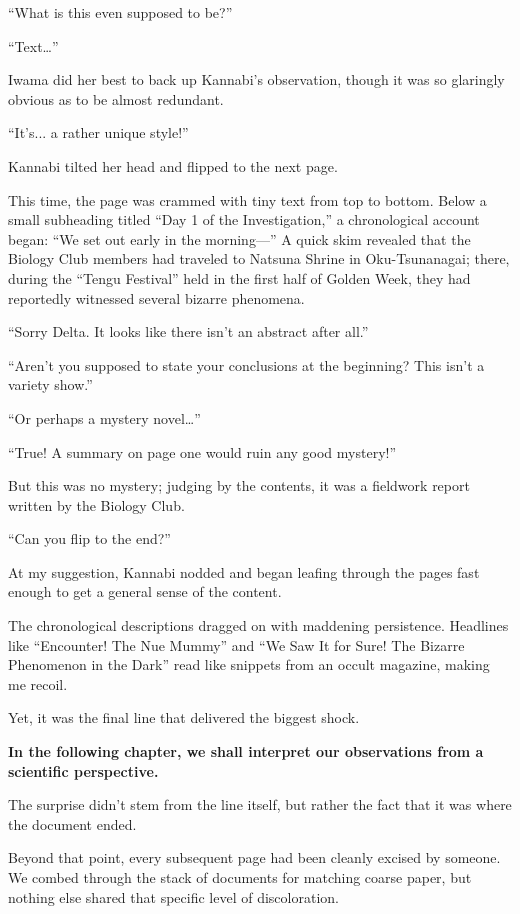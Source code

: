\documentclass[
    a4paper,
    12pt,
    twoside,
    openany,
    UTF8,
    fontset=windows
]{ctexbook}
\begin{document}
``What is this even supposed to be?''

``Text\dots''

Iwama did her best to back up Kannabi's observation, though it was so glaringly obvious as to be almost redundant.

``It's... a rather unique style!''

Kannabi tilted her head and flipped to the next page.

This time, the page was crammed with tiny text from top to bottom. Below a small subheading titled ``Day 1 of the Investigation,'' a chronological account began: ``We set out early in the morning---'' A quick skim revealed that the Biology Club members had traveled to Natsuna Shrine in Oku-Tsunanagai; there, during the ``Tengu Festival'' held in the first half of Golden Week, they had reportedly witnessed several bizarre phenomena.

``Sorry Delta. It looks like there isn't an abstract after all.''

``Aren't you supposed to state your conclusions at the beginning? This isn't a variety show.''

``Or perhaps a mystery novel\dots''

``True! A summary on page one would ruin any good mystery!''

But this was no mystery; judging by the contents, it was a fieldwork report written by the Biology Club.

``Can you flip to the end?''

At my suggestion, Kannabi nodded and began leafing through the pages fast enough to get a general sense of the content.

The chronological descriptions dragged on with maddening persistence. Headlines like ``Encounter! The Nue Mummy'' and ``We Saw It for Sure! The Bizarre Phenomenon in the Dark'' read like snippets from an occult magazine, making me recoil.

Yet, it was the final line that delivered the biggest shock.

\textbf{In the following chapter, we shall interpret our observations from a scientific perspective.}

The surprise didn't stem from the line itself, but rather the fact that it was where the document ended.

Beyond that point, every subsequent page had been cleanly excised by someone. We combed through the stack of documents for matching coarse paper, but nothing else shared that specific level of discoloration.
\end{document}
